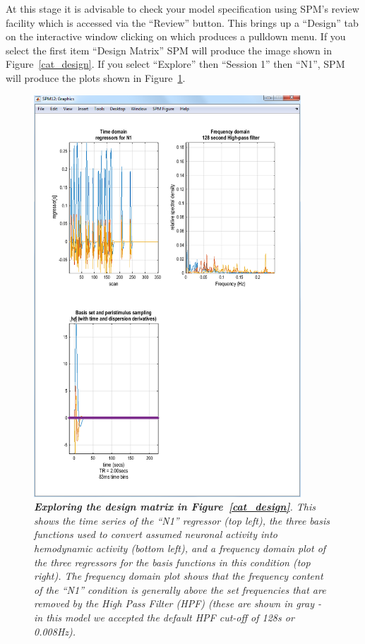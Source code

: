 At this stage it is advisable to check your model specification using SPM's review facility which is accessed via the ``Review'' button. This brings up a ``Design'' tab on the interactive window clicking on which produces a pulldown menu. If you select the first item ``Design Matrix'' SPM will produce the image shown in Figure~\ref{cat_design}. If you select ``Explore'' then ``Session 1'' then ``N1'', SPM will produce the plots shown in Figure~\ref{cat_explore}.
\begin{figure}
\begin{center}
\includegraphics[width=100mm]{faces/cat_explore}
\caption{\em \textbf{Exploring the design matrix in Figure~\ref{cat_design}}. This shows the time series of the ``N1'' regressor (top left), the three basis functions used to convert assumed neuronal activity into hemodynamic activity (bottom left), and a frequency domain plot of the three regressors for the basis functions in this condition (top right). The frequency domain plot shows that the frequency content of the ``N1'' condition is generally above the set frequencies that are removed by the High Pass Filter (HPF) (these are shown in gray - in this model we accepted the default HPF cut-off of 128s or 0.008Hz). \label{cat_explore}}
\end{center}
\end{figure}

